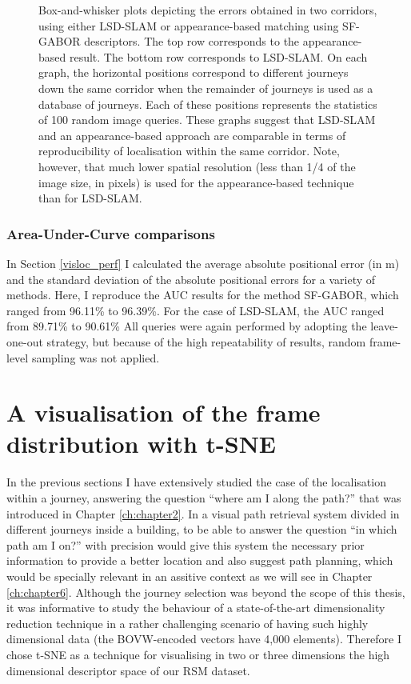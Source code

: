 \begin{figure}
\caption{Box-and-whisker plots depicting the errors obtained in two corridors, using either LSD-SLAM or appearance-based matching using SF-GABOR descriptors. The top row corresponds to the appearance-based result. The bottom row corresponds to LSD-SLAM. On each graph, the horizontal positions correspond to different journeys down the same corridor when the remainder of journeys is used as a database of journeys. Each of these positions represents the statistics of 100 random image queries. These graphs suggest that LSD-SLAM and an appearance-based approach are comparable in terms of reproducibility of localisation within the same corridor. Note, however, that much lower spatial resolution (less than 1/4 of the image size, in pixels) is used for the appearance-based technique than for LSD-SLAM.}
\label{fig:reprod}
\end{figure}

\subsubsection{Area-Under-Curve comparisons}
In Section \ref{visloc_perf} I calculated the average absolute positional error (in m) and the standard deviation of the absolute positional errors for a variety of methods. Here, I reproduce the AUC results for the method SF-GABOR, which ranged from 96.11\% to 96.39\%. For the case of LSD-SLAM, the AUC ranged from 89.71\% to 90.61\% All queries were again performed by adopting the leave-one-out strategy, but because of the high repeatability of results, random frame-level sampling was not applied.  



\section{A visualisation of the frame distribution with t-SNE}

In the previous sections I have extensively studied the case of the localisation within a journey, answering the question ``where am I along the path?'' that was introduced in Chapter \ref{ch:chapter2}. In a visual path retrieval system divided in different journeys inside a building, to be able to answer the question ``in which path am I on?'' with precision would give this system the necessary prior information to provide a better location and also suggest path planning, which would be specially relevant in an assitive context as we will see in Chapter \ref{ch:chapter6}. Although the journey selection was beyond the scope of this thesis, it was informative to study the behaviour of a state-of-the-art dimensionality reduction technique in a rather challenging scenario of having such highly dimensional data (the BOVW-encoded vectors have 4,000 elements). Therefore I chose t-SNE as a technique for visualising in two or three dimensions the high dimensional descriptor space of our RSM dataset.

